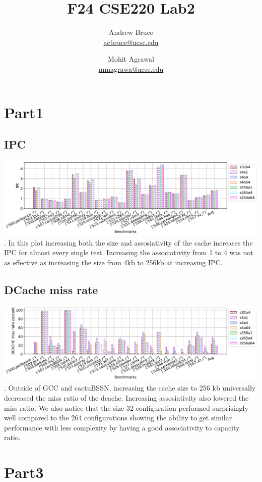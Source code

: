 \documentclass{article}
\title{F24 CSE220 Lab2}
\author{
  Andrew Bruce \\ \href{mailto:acbruce@ucsc.edu}{acbruce@ucsc.edu} \and
  Mohit Agrawal \\ \href{mailto:mmagrawa@ucsc.edu}{mmagrawa@ucsc.edu}
}
\begin{document}
\maketitle

\section*{Part1}
\subsection*{IPC}
\includegraphics[width=\textwidth]{Part1/IPC.pdf}.
In this plot increasing both the size and assosiativity of the cache increases the IPC for almost every single test. Increasing the associativity from 1 to 4 was not as effective as increasing the size from 4kb to 256kb at increasing IPC.
\subsection*{DCache miss rate}
\includegraphics[width=\textwidth]{Part1/DCACHE.pdf}.
Outside of GCC and cactuBSSN, increasing the cache size to 256 kb universally decreased the miss ratio of the dcache. Increasing assosiativity also lowered the miss ratio. We also notice that the size 32 configuration performed surprisingly well compared to the 264 configurations showing the ability to get similar performance with less complexity by having a good associativity to capacity ratio. 
\section*{Part3}
\end{document}
